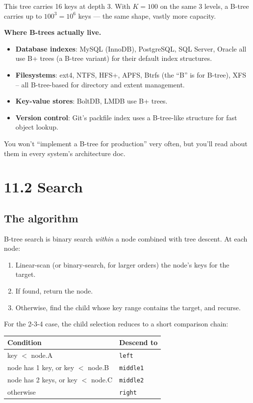 \documentclass[11pt]{article}
\begin{document}
This tree carries 16 keys at depth 3. With $K = 100$ on the same 3
levels, a B-tree carries up to $100^3 = 10^6$ keys --- the same
shape, vastly more capacity.

\begin{examplebox}
\textbf{Where B-trees actually live.}
\begin{itemize}[leftmargin=*]
    \item \textbf{Database indexes}: MySQL (InnoDB), PostgreSQL, SQL Server, Oracle all use B+ trees (a B-tree variant) for their default index structures.
    \item \textbf{Filesystems}: ext4, NTFS, HFS+, APFS, Btrfs (the ``B'' is for B-tree), XFS -- all B-tree-based for directory and extent management.
    \item \textbf{Key-value stores}: BoltDB, LMDB use B+ trees.
    \item \textbf{Version control}: Git's packfile index uses a B-tree-like structure for fast object lookup.
\end{itemize}
You won't ``implement a B-tree for production'' very often, but you'll read about them in every system's architecture doc.
\end{examplebox}

\section{11.2 Search}

\subsection*{The algorithm}

B-tree search is binary search \emph{within} a node combined with tree descent. At each node:
\begin{enumerate}[leftmargin=*]
    \item Linear-scan (or binary-search, for larger orders) the node's keys for the target.
    \item If found, return the node.
    \item Otherwise, find the child whose key range contains the target, and recurse.
\end{enumerate}

For the 2-3-4 case, the child selection reduces to a short comparison chain:

\begin{center}
\begin{tabular}{ll}
\hline
Condition & Descend to \\
\hline
key $<$ node.A & \texttt{left} \\
node has 1 key, or key $<$ node.B & \texttt{middle1} \\
node has 2 keys, or key $<$ node.C & \texttt{middle2} \\
otherwise & \texttt{right} \\
\hline
\end{tabular}
\end{center}
\end{document}
